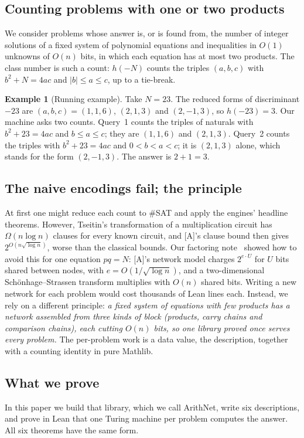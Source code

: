 \documentclass[10pt]{amsart}
\theoremstyle{plain}
\theoremstyle{definition}
\newtheorem{example}[theorem]{Example}
\theoremstyle{remark}
\numberwithin{equation}{section}
\newcommand{\A}{\textup{[A]}}
\begin{document}
\subsection{Counting problems with one or two products}
We consider problems whose answer is, or is found from, the number of integer solutions of a fixed
system of polynomial equations and inequalities in $O(1)$ unknowns of $O(n)$ bits, in which each
equation has at most two products. The class number is such a count:
$h(-N)$ counts the triples $(a,b,c)$ with $b^2+N=4ac$ and $|b|\le a\le c$, up to a tie-break.

\begin{example}[Running example]\label{ex:23}
Take $N=23$. The reduced forms of discriminant $-23$ are $(a,b,c)=(1,1,6)$, $(2,1,3)$ and $(2,-1,3)$,
so $h(-23)=3$. Our machine asks two counts. Query~1 counts the triples of naturals with $b^2+23=4ac$ and
$b\le a\le c$; they are $(1,1,6)$ and $(2,1,3)$. Query~2 counts the triples with $b^2+23=4ac$ and
$0<b<a<c$; it is $(2,1,3)$ alone, which stands for the form $(2,-1,3)$. The answer is $2+1=3$.
\end{example}

\subsection{The naive encodings fail; the principle}
At first one might reduce each count to $\#$SAT and apply the engines' headline theorems. However,
Tseitin's transformation of a multiplication circuit has $\Omega(n\log n)$ clauses for every known
circuit, and \A's clause bound then gives $2^{O(n\sqrt{\log n})}$, worse than the classical bounds. Our
factoring note~\cite{TulFac26} showed how to avoid this for one equation $pq=N$: \A's network model
charges $2^{e\cdot U}$ for $U$ bits shared between nodes, with $e=O(1/\sqrt{\log n})$, and a
two-dimensional Sch\"onhage--Strassen transform multiplies with $O(n)$ shared bits. Writing a new
network for each problem would cost thousands of Lean lines each. Instead, we rely on a different
principle: \emph{a fixed system of equations with few products has a network assembled from three kinds of
block (products, carry chains and comparison chains), each cutting $O(n)$ bits, so one library proved once
serves every problem.} The per-problem work is a data value, the description, together with a
counting identity in pure Mathlib.

\subsection{What we prove}
In this paper we build that library, which we call ArithNet, write six descriptions, and prove in Lean
that one Turing machine per problem computes the answer. All six theorems have the same form.
\end{document}
